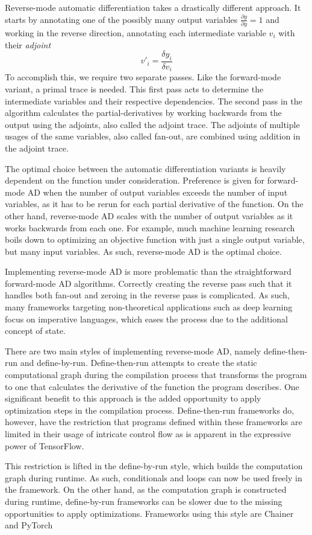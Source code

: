 Reverse-mode automatic differentiation takes a drastically different approach.
It starts by annotating one of the possibly many output variables $\frac{\partial{y}}{\partial{y}} = 1$ and working in the reverse direction, annotating each intermediate variable $v_i$ with their \emph{adjoint}
$$v'_i=\frac{\delta y_i}{\delta v_i}$$
To accomplish this, we require two separate passes.
Like the forward-mode variant, a primal trace is needed.
This first pass acts to determine the intermediate variables and their respective dependencies.
The second pass in the algorithm calculates the partial-derivatives by working backwards from the output using the adjoints, also called the adjoint trace.
The adjoints of multiple usages of the same variables, also called fan-out, are combined using addition in the adjoint trace.

The optimal choice between the automatic differentiation variants is heavily dependent on the function under consideration.
Preference is given for forward-mode AD when the number of output variables exceeds the number of input variables, as it has to be rerun for each partial derivative of the function.
On the other hand, reverse-mode AD scales with the number of output variables as it works backwards from each one.
For example, much machine learning research boils down to optimizing an objective function with just a single output variable, but many input variables.
As such, reverse-mode AD is the optimal choice.

Implementing reverse-mode AD is more problematic than the straightforward forward-mode AD algorithms.
Correctly creating the reverse pass such that it handles both fan-out and zeroing in the reverse pass is complicated.
As such, many frameworks targeting non-theoretical applications such as deep learning focus on imperative languages, which eases the process due to the additional concept of state.

There are two main styles of implementing reverse-mode AD, namely define-then-run and define-by-run.
Define-then-run attempts to create the static computational graph during the compilation process that transforms the program to one that calculates the derivative of the function the program describes.
One significant benefit to this approach is the added opportunity to apply optimization steps in the compilation process.
Define-then-run frameworks do, however, have the restriction that programs defined within these frameworks are limited in their usage of intricate control flow as is apparent in the expressive power of TensorFlow.

This restriction is lifted in the define-by-run style, which builds the computation graph during runtime.
As such, conditionals and loops can now be used freely in the framework.
On the other hand, as the computation graph is constructed during runtime, define-by-run frameworks can be slower due to the missing opportunities to apply optimizations.
Frameworks using this style are Chainer and PyTorch
